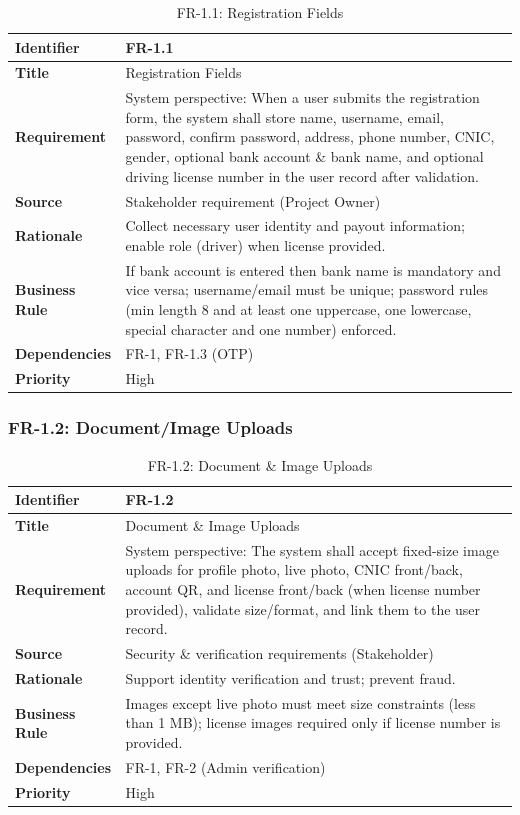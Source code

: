 \begin{longtable}{|p{3cm}|p{12cm}|}
\caption{FR-1.1: Registration Fields}
\label{tab:fr-1-1} \\
\hline
\rowcolor{lightgray!30}
\textbf{Identifier} & FR-1.1 \\
\hline
\textbf{Title} & Registration Fields \\
\hline
\textbf{Requirement} & System perspective: When a user submits the registration form, the system shall store name, username, email, password, confirm password, address, phone number, CNIC, gender, optional bank account \& bank name, and optional driving license number in the user record after validation. \\
\hline
\textbf{Source} & Stakeholder requirement (Project Owner) \\
\hline
\textbf{Rationale} & Collect necessary user identity and payout information; enable role (driver) when license provided. \\
\hline
\textbf{Business Rule} & If bank account is entered then bank name is mandatory and vice versa; username/email must be unique; password rules (min length 8 and at least one uppercase, one lowercase, special character and one number) enforced. \\
\hline
\textbf{Dependencies} & FR-1, FR-1.3 (OTP) \\
\hline
\textbf{Priority} & High \\
\hline
\end{longtable}

\subsubsection{FR-1.2: Document/Image Uploads}

\begin{longtable}{|p{3cm}|p{12cm}|}
\caption{FR-1.2: Document \& Image Uploads}
\label{tab:fr-1-2} \\
\hline
\rowcolor{lightgray!30}
\textbf{Identifier} & FR-1.2 \\
\hline
\textbf{Title} & Document \& Image Uploads \\
\hline
\textbf{Requirement} & System perspective: The system shall accept fixed-size image uploads for profile photo, live photo, CNIC front/back, account QR, and license front/back (when license number provided), validate size/format, and link them to the user record. \\
\hline
\textbf{Source} & Security \& verification requirements (Stakeholder) \\
\hline
\textbf{Rationale} & Support identity verification and trust; prevent fraud. \\
\hline
\textbf{Business Rule} & Images except live photo must meet size constraints (less than 1 MB); license images required only if license number is provided. \\
\hline
\textbf{Dependencies} & FR-1, FR-2 (Admin verification) \\
\hline
\textbf{Priority} & High \\
\hline
\end{longtable}

